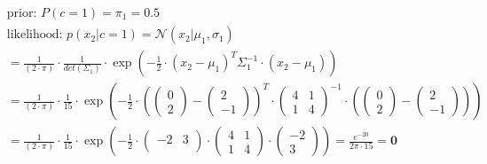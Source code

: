 \documentclass[12pt]{article}
\begin{document}
\begin{enumerate}
\begin{enumerate}[label=\arabic*)]
\begin{itemize}[label=]
            \begin{equation*}
                \begin{aligned}
                    &\text{prior: } P(c=1) = \pi_1 = \mathbf{0.5} \\
                    &\text{likelihood: } p(x_2|c=1) = \mathcal{N}(x_2| \mu_1, \sigma_1) \\
                    &= \frac{1}{(2 \cdot \pi)} \cdot \frac{1}{det(\Sigma_1)} \cdot \exp \left( -\frac{1}{2} \cdot (x_2 - \mu_1)^{T} \Sigma_1^{-1} \cdot (x_2 - \mu_1) \right)\\
                    &= \frac{1}{(2 \cdot \pi)} \cdot \frac{1}{15} \cdot \exp \left( -\frac{1}{2} \cdot \left(\begin{pmatrix}
                    0\\
                    2
                    \end{pmatrix} - \begin{pmatrix}
                    2\\
                    -1
                    \end{pmatrix}\right)^{T} \cdot \begin{pmatrix}
                    4 & 1\\
                    1 & 4
                    \end{pmatrix}^{-1} \cdot \left(\begin{pmatrix}
                    0\\
                    2
                    \end{pmatrix} - \begin{pmatrix}
                    2\\
                    -1
                    \end{pmatrix}\right) \right)\\
                    &= \frac{1}{(2 \cdot \pi)} \cdot \frac{1}{15} \cdot \exp \left( -\frac{1}{2} \cdot \begin{pmatrix}
                    -2 & 3\\
                    \end{pmatrix} \cdot \begin{pmatrix}
                    4 & 1\\
                    1 & 4
                    \end{pmatrix} \cdot \begin{pmatrix}
                    -2\\
                    3
                    \end{pmatrix} \right) = \frac{e^{-20}}{2 \pi \cdot 15} = \mathbf{0}\\ 

\end{aligned}
\end{equation*}
\end{itemize}
\end{enumerate}
\end{enumerate}
\end{document}
